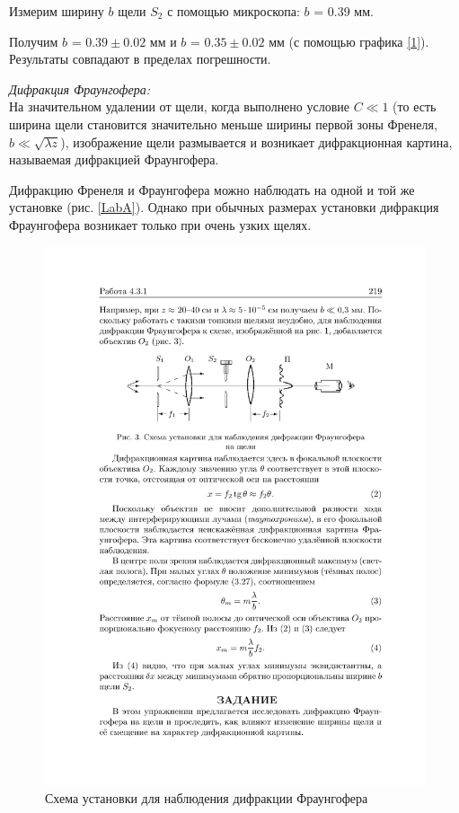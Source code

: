 \documentclass[a4paper, 12pt]{article}%
\newcommand{\RomanNumeralCaps}[1]{\uppercase\expandafter{\romannumeral#1}}
\begin{document}
Измерим ширину $b$ щели $S_2$ с помощью микроскопа: $b$ = 0.39 мм.

Получим $b$ = $0.39 \pm 0.02$ мм и $b$ = $0.35 \pm 0.02$ мм (с помощью графика \ref{1}). Результаты совпадают в пределах погрешности.

\newpage
	\RomanNumeralCaps 2 \textit{Дифракция Фраунгофера:}\\
	
	На значительном удалении от щели, когда выполнено условие $ C \ll 1 $
	(то есть ширина щели становится значительно меньше ширины первой
	зоны Френеля, $ b \ll \sqrt{\lambda z} $), изображение щели размывается и возникает
	дифракционная картина, называемая дифракцией Фраунгофера.
	
	Дифракцию Френеля и Фраунгофера можно наблюдать на одной
	и той же установке (рис. \ref{LabA}). Однако при обычных размерах установки дифракция Фраунгофера возникает только при очень узких щелях.
	
		\begin{figure}[H]
		\begin{center}
			\includegraphics[width=0.8\linewidth]{b.pdf}
			\caption{Схема установки для наблюдения дифракции Фраунгофера}
			\label{LabB}
		\end{center}
	\end{figure}
	
\end{document}
